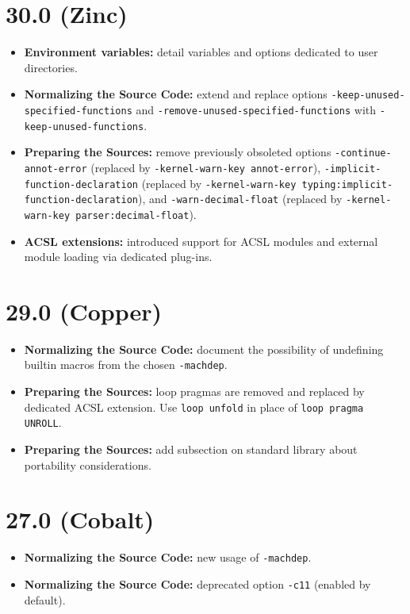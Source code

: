 \section*{30.0 (Zinc)}
\begin{itemize}
\item \textbf{Environment variables:} detail variables and options dedicated to
  user directories.
\item \textbf{Normalizing the Source Code:} extend and replace options
  \texttt{-keep-unused-specified-functions} and
  \texttt{-remove-unused-specified-functions} with
  \texttt{-keep-unused-functions}.
\item \textbf{Preparing the Sources:} remove previously obsoleted
  options \texttt{-continue-annot-error} (replaced by
  \texttt{-kernel-warn-key annot-error}),
  \texttt{-implicit-function-declaration} (replaced by
  \texttt{-kernel-warn-key typing:implicit-function-declaration}),
  and \texttt{-warn-decimal-float} (replaced by
  \texttt{-kernel-warn-key parser:decimal-float}).
\item \textbf{ACSL extensions:} introduced support for ACSL modules
  and external module loading via dedicated plug-ins.
\end{itemize}

\section*{29.0 (Copper)}
\begin{itemize}
\item \textbf{Normalizing the Source Code:} document the possibility of
  undefining builtin macros from the chosen \texttt{-machdep}.
\item \textbf{Preparing the Sources:} loop pragmas are removed and replaced
  by dedicated ACSL extension.
  Use \verb+loop unfold+ in place of \verb+loop pragma UNROLL+.
\item \textbf{Preparing the Sources:} add subsection on standard library about
  portability considerations.
\end{itemize}

\section*{27.0 (Cobalt)}
\begin{itemize}
\item \textbf{Normalizing the Source Code:} new usage of \texttt{-machdep}.
\item \textbf{Normalizing the Source Code:} deprecated option \texttt{-c11}
  (enabled by default).
\end{itemize}

